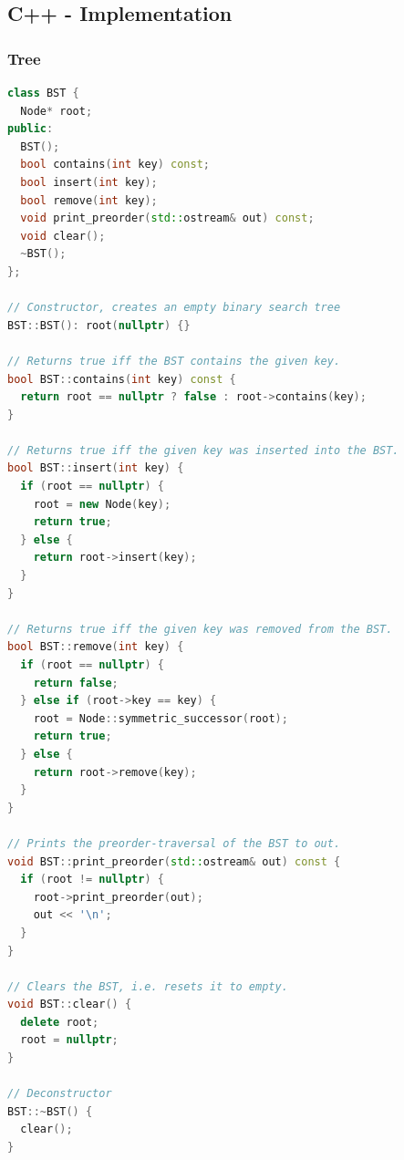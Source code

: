 \subsection{C++ - Implementation}\smallskip
\subsubsection{Tree}\smallskip
\begin{lstlisting}[language=C++]
class BST {
  Node* root;
public:
  BST();
  bool contains(int key) const;
  bool insert(int key);
  bool remove(int key);
  void print_preorder(std::ostream& out) const;
  void clear();
  ~BST();
};

// Constructor, creates an empty binary search tree
BST::BST(): root(nullptr) {}

// Returns true iff the BST contains the given key.
bool BST::contains(int key) const {
  return root == nullptr ? false : root->contains(key);
}
  
// Returns true iff the given key was inserted into the BST.
bool BST::insert(int key) {
  if (root == nullptr) {
    root = new Node(key);
    return true;
  } else {
    return root->insert(key);
  }
}
  
// Returns true iff the given key was removed from the BST.
bool BST::remove(int key) {
  if (root == nullptr) {
    return false;
  } else if (root->key == key) {
    root = Node::symmetric_successor(root);
    return true;
  } else {
    return root->remove(key);
  }
}
  
// Prints the preorder-traversal of the BST to out.
void BST::print_preorder(std::ostream& out) const {
  if (root != nullptr) {
    root->print_preorder(out);
    out << '\n';
  }
}

// Clears the BST, i.e. resets it to empty.
void BST::clear() {
  delete root;
  root = nullptr;
}

// Deconstructor
BST::~BST() {
  clear();
}
\end{lstlisting}



